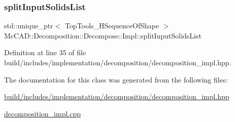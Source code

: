 \subsubsection{\texorpdfstring{split\+Input\+Solids\+List}{splitInputSolidsList}}
{\footnotesize\ttfamily std\+::unique\+\_\+ptr$<$ Top\+Tools\+\_\+\+H\+Sequence\+Of\+Shape $>$ Mc\+C\+A\+D\+::\+Decomposition\+::\+Decompose\+::\+Impl\+::split\+Input\+Solids\+List}



Definition at line 35 of file build/includes/implementation/decomposition/decomposition\+\_\+impl.\+hpp.



The documentation for this class was generated from the following files\+:\begin{DoxyCompactItemize}
\item 
\hyperlink{build_2includes_2implementation_2decomposition_2decomposition__impl_8hpp}{build/includes/implementation/decomposition/decomposition\+\_\+impl.\+hpp}\item 
\hyperlink{decomposition__impl_8cpp}{decomposition\+\_\+impl.\+cpp}\end{DoxyCompactItemize}
